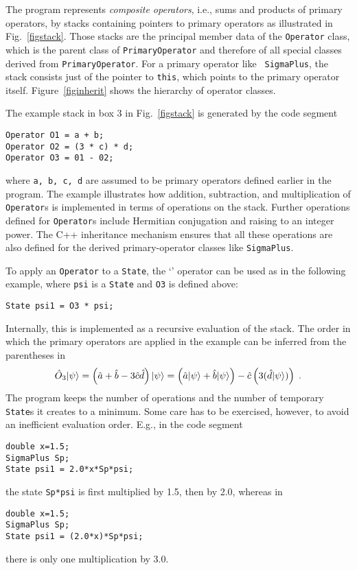 The program represents {\it composite operators}, i.e., sums and products of
primary operators, by stacks containing
pointers to primary operators as illustrated in Fig.~\ref{figstack}. Those
stacks are the principal member data of the {\tt Operator} class, which is the
parent class of {\tt PrimaryOperator} and therefore of all special classes
derived from {\tt PrimaryOperator}. For a primary operator like {\tt
SigmaPlus}, the stack consists just of the pointer to {\tt *this}, which points
to the primary operator itself. Figure~\ref{figinherit} shows the hierarchy of
operator classes.

The example stack in box 3 in Fig.~\ref{figstack} is generated by the code
segment
\begin{verbatim}
Operator O1 = a + b;
Operator O2 = (3 * c) * d;
Operator O3 = 01 - 02;
\end{verbatim}
where {\tt a, b, c, d} are assumed to be primary operators defined earlier in
the program.  The example illustrates how addition, subtraction, and
multiplication of {\tt Operator}s is implemented in terms of operations on the
stack. Further operations defined for {\tt Operator}s include Hermitian
conjugation and raising to an integer power. The C++ inheritance mechanism
ensures that all these operations are also defined for the derived
primary-operator classes like {\tt SigmaPlus}.

To apply an {\tt Operator} to a {\tt State}, the `{\tt *}' operator can be used
as in the following example, where {\tt psi} is a {\tt State} and {\tt O3} is
defined above:
\begin{verbatim}
State psi1 = O3 * psi;
\end{verbatim}
Internally, this is implemented as a recursive evaluation of the stack.
The order in which the primary operators are applied in the example can be
inferred from the parentheses in
\begin{equation}
\hat O_3| \psi \rangle = \left(\hat a + \hat b - 3\hat c\hat d\right)| \psi \rangle
= \left(\hat a| \psi \rangle + \hat b| \psi \rangle\right) 
 - \hat c\left(3(\hat d| \psi \rangle)\right) \;.
\end{equation}
The program keeps the number of operations and the number of temporary
{\tt State}s it creates to a minimum. Some care has to be exercised, however, to
avoid an inefficient evaluation order. E.g., in the code segment
\begin{verbatim}
double x=1.5;
SigmaPlus Sp;
State psi1 = 2.0*x*Sp*psi;
\end{verbatim}
the state {\tt Sp*psi} is first multiplied by 1.5, then by 2.0, whereas in
\begin{verbatim}
double x=1.5;
SigmaPlus Sp;
State psi1 = (2.0*x)*Sp*psi;
\end{verbatim}
there is only one multiplication by 3.0. 

